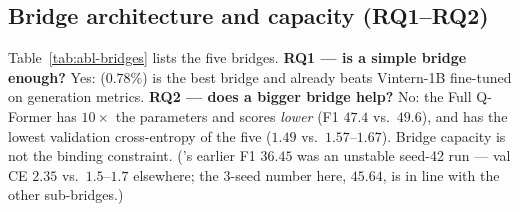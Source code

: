 \subsection{Bridge architecture and capacity (RQ1--RQ2)}
\label{sec:abl-bridge}

Table~\ref{tab:abl-bridges} lists the five bridges. \textbf{RQ1 --- is a simple
bridge enough?} Yes: \multitoken{} ($0.78\%$) is the best bridge and already
beats Vintern-1B fine-tuned on generation metrics. \textbf{RQ2 --- does a bigger
bridge help?} No: the Full Q-Former has $10\times$ the parameters and scores
\emph{lower} (F1 $47.4$ vs.\ $49.6$), and \multitoken{} has the lowest validation
cross-entropy of the five ($1.49$ vs.\ $1.57$--$1.67$). Bridge capacity is not the
binding constraint.
('s earlier F1 $36.45$ was an unstable seed-42 run --- val CE
$2.35$ vs.\ $1.5$--$1.7$ elsewhere; the 3-seed number here, $45.64$, is in line
with the other sub-bridges.)

\begin{table}[t]
  \centering\footnotesize
  \caption{Five bridges on the frozen backbone (val), plain and $+$ decoder
  LoRA (r=16 attention, 1 epoch). Plain: 2-epoch 3-seed mean (\multitoken{}
  4-seed); LoRA: 3-seed ( seed 42). \dF{}~[CI] is the
  paired-bootstrap $95\%$ CI on the per-sample LoRA lift over the $5{,}463$ val
  samples ($P(\Delta{>}0)=1.000$, every row).}
  \label{tab:abl-bridges}
\end{table}

